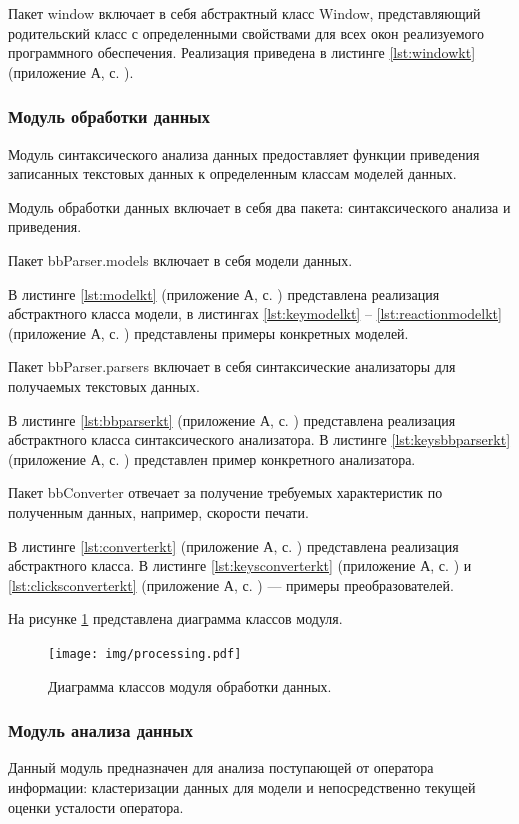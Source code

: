 Пакет window включает в себя абстрактный класс Window, представляющий родительский класс с определенными свойствами для всех окон реализуемого программного обеспечения. Реализация приведена в листинге \ref{lst:windowkt} (приложение А, с. \pageref{chp:application-a}).

\subsubsection{Модуль обработки данных}
Модуль синтаксического анализа данных предоставляет функции приведения записанных текстовых данных к определенным классам моделей данных.

Модуль обработки данных включает в себя два пакета: синтаксического анализа и приведения.

Пакет bbParser.models включает в себя модели данных.

В листинге \ref{lst:modelkt} (приложение А, с. \pageref{chp:application-a}) представлена реализация абстрактного класса модели, в листингах \ref{lst:keymodelkt} -- \ref{lst:reactionmodelkt} (приложение А, с. \pageref{chp:application-a}) представлены примеры конкретных моделей.

Пакет bbParser.parsers включает в себя синтаксические анализаторы для получаемых текстовых данных.

В листинге \ref{lst:bbparserkt} (приложение А, с. \pageref{chp:application-a}) представлена реализация абстрактного класса синтаксического анализатора. В листинге \ref{lst:keysbbparserkt} (приложение А, с. \pageref{chp:application-a}) представлен пример конкретного анализатора.

Пакет bbConverter отвечает за получение требуемых характеристик по полученным данных, например, скорости печати.

В листинге \ref{lst:converterkt} (приложение А, с. \pageref{chp:application-a}) представлена реализация абстрактного класса. В листинге \ref{lst:keysconverterkt} (приложение А, с. \pageref{chp:application-a}) и \ref{lst:clicksconverterkt} (приложение А, с. \pageref{chp:application-a}) --- примеры преобразователей.

На рисунке \ref{fig:processingUml} представлена диаграмма классов модуля.
\begin{figure}
	\centering
	\texttt{[image: img/processing.pdf]}
	\caption{Диаграмма классов модуля обработки данных.}
	\label{fig:processingUml}
\end{figure}

\subsubsection{Модуль анализа данных}
Данный модуль предназначен для анализа поступающей от оператора \newline информации: кластеризации данных для модели и непосредственно текущей оценки усталости оператора.

